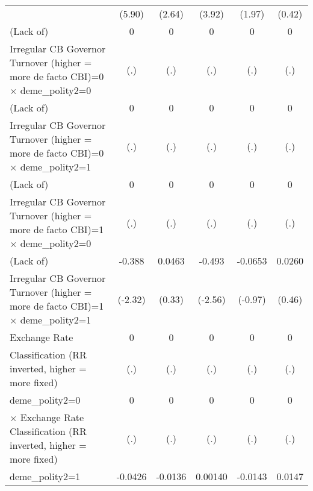 {\begin{tabular}{l*{5}{c}}
                &   (5.90)         &   (2.64)         &   (3.92)         &   (1.97)         &   (0.42)         \\
\addlinespace
(Lack of)       &        0         &        0         &        0         &        0         &        0         \\
Irregular CB Governor Turnover (higher = more de facto CBI)=0 $\times$ deme\_polity2=0&      (.)         &      (.)         &      (.)         &      (.)         &      (.)         \\
\addlinespace
(Lack of)       &        0         &        0         &        0         &        0         &        0         \\
Irregular CB Governor Turnover (higher = more de facto CBI)=0 $\times$ deme\_polity2=1&      (.)         &      (.)         &      (.)         &      (.)         &      (.)         \\
\addlinespace
(Lack of)       &        0         &        0         &        0         &        0         &        0         \\
Irregular CB Governor Turnover (higher = more de facto CBI)=1 $\times$ deme\_polity2=0&      (.)         &      (.)         &      (.)         &      (.)         &      (.)         \\
\addlinespace
(Lack of)       &   -0.388\sym{*}  &   0.0463         &   -0.493\sym{*}  &  -0.0653         &   0.0260         \\
Irregular CB Governor Turnover (higher = more de facto CBI)=1 $\times$ deme\_polity2=1&  (-2.32)         &   (0.33)         &  (-2.56)         &  (-0.97)         &   (0.46)         \\
\addlinespace
Exchange Rate   &        0         &        0         &        0         &        0         &        0         \\
Classification (RR inverted, higher = more fixed)&      (.)         &      (.)         &      (.)         &      (.)         &      (.)         \\
\addlinespace
deme\_polity2=0  &        0         &        0         &        0         &        0         &        0         \\
$\times$ Exchange Rate Classification (RR inverted, higher = more fixed)&      (.)         &      (.)         &      (.)         &      (.)         &      (.)         \\
\addlinespace
deme\_polity2=1  &  -0.0426\sym{**} &  -0.0136         &  0.00140         &  -0.0143         &   0.0147         \\

\end{tabular}}
